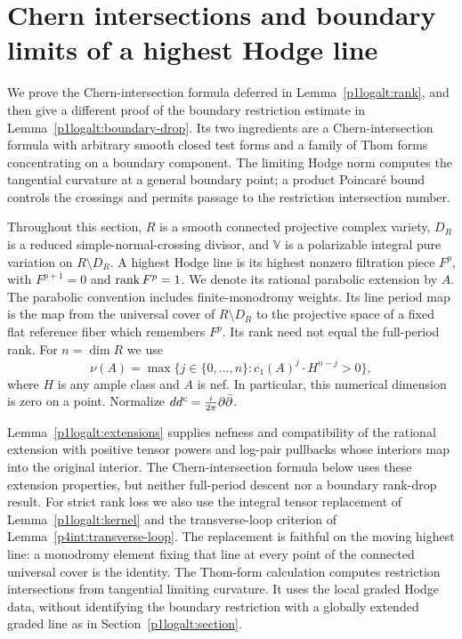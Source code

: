 \section{Chern intersections and boundary limits of a highest Hodge line}
\label{p1varhd:section}

We prove the Chern-intersection formula deferred in
Lemma~\ref{p1logalt:rank}, and then give a different proof of the
boundary restriction estimate in Lemma~\ref{p1logalt:boundary-drop}.  Its two ingredients are a Chern-intersection
formula with arbitrary smooth closed test forms and a family of Thom
forms concentrating on a boundary component.  The limiting Hodge norm
computes the tangential curvature at a general boundary point; a product
Poincar\'e bound controls the crossings and permits passage to the
restriction intersection number.

Throughout this section, $R$ is a smooth connected projective complex
variety, $D_R$ is a reduced simple-normal-crossing divisor, and
$\mathbb V$ is a polarizable integral pure variation on $R\setminus D_R$.
A highest Hodge line is its highest nonzero filtration piece $F^p$, with
$F^{p+1}=0$ and $\operatorname{rank} F^p=1$.  We denote its rational parabolic
extension by $A$.  The parabolic convention includes finite-monodromy
weights.  Its line period map is the map from the universal cover of
$R\setminus D_R$ to the projective space of a fixed flat reference fiber
which remembers $F^p$.  Its rank need not equal the full-period rank.
For $n=\dim R$ we use
\[
 \nu(A)=\max\{j\in\{0,\ldots,n\}:
                   c_1(A)^j\cdot H^{n-j}>0\},
\]
where $H$ is any ample class and $A$ is nef.  In particular, this
numerical dimension is zero on a point.  Normalize
$dd^c=\frac{i}{2\pi}\partial\bar\partial$.

Lemma~\ref{p1logalt:extensions} supplies nefness and compatibility of
the rational extension with positive tensor powers and log-pair
pullbacks whose interiors map into the original interior. The
Chern-intersection formula below uses these extension properties,
but neither full-period descent nor a boundary rank-drop result.
For strict rank loss we also use the integral tensor replacement
of Lemma~\ref{p1logalt:kernel} and the transverse-loop criterion of
Lemma~\ref{p4int:transverse-loop}. The replacement is faithful on
the moving highest line: a monodromy element fixing that line at
every point of the connected universal cover is the identity.
The Thom-form calculation computes restriction intersections from
tangential limiting curvature. It uses the local graded Hodge data,
without identifying the boundary restriction with a globally extended
graded line as in Section~\ref{p1logalt:section}.


